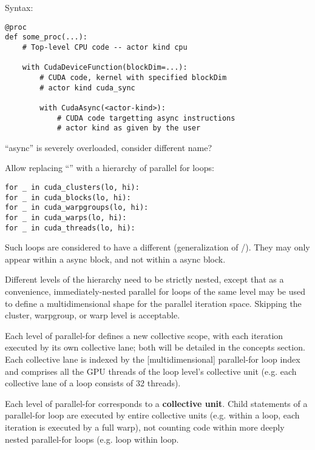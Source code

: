 Syntax:
{\color{lightttColor}
\begin{verbatim}
@proc
def some_proc(...):
    # Top-level CPU code -- actor kind cpu

    with CudaDeviceFunction(blockDim=...):
        # CUDA code, kernel with specified blockDim
        # actor kind cuda_sync

        with CudaAsync(<actor-kind>):
            # CUDA code targetting async instructions
            # actor kind as given by the user
\end{verbatim}
}

 ``async'' is severely overloaded, consider different name?

\filbreak
{} Allow replacing ``'' with a hierarchy of parallel for loops:

\filbreak
{\color{lightttColor}
\begin{verbatim}
for _ in cuda_clusters(lo, hi):
for _ in cuda_blocks(lo, hi):
for _ in cuda_warpgroups(lo, hi):
for _ in cuda_warps(lo, hi):
for _ in cuda_threads(lo, hi):
\end{verbatim}
}

\filbreak
Such loops are considered to have a different  (generalization of /).
They may only appear within a  async block, and not within a  async block.

\filbreak
Different levels of the hierarchy need to be strictly nested, except that as a convenience, immediately-nested parallel for loops of the same level may be used to define a multidimensional shape for the parallel iteration space.
Skipping the cluster, warpgroup, or warp level is acceptable.

\filbreak
Each level of parallel-for defines a new collective scope, with each iteration executed by its own collective lane; both will be detailed in the concepts section.
Each collective lane is indexed by the [multidimensional] parallel-for loop index and comprises all the GPU threads of the loop level's collective unit (e.g. each collective lane of a  loop consists of 32 threads).

\filbreak
Each level of parallel-for corresponds to a \textbf{collective unit}.
Child statements of a parallel-for loop are executed by entire collective units (e.g. within a  loop, each iteration is executed by a full warp), not counting code within more deeply nested parallel-for loops (e.g.  loop within  loop.

